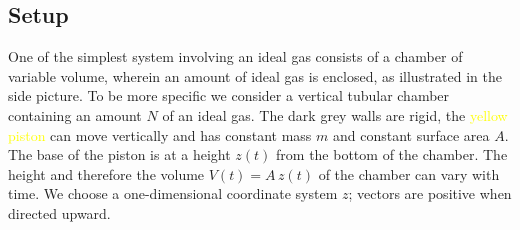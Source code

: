 \documentclass[a4paper,12pt,%
onecolumn,oneside,%
british%
]{memoir}
\renewcommand*{\|}[1][]{\nonscript\:#1\vert\nonscript\:\mathopen{}}
\newcommand*{\yN}{N}
\newcommand*{\ym}{m}%
\begin{document}
\subsection{Setup}
\label{sec:idealgas_ex_setup}

One of the simplest system involving an ideal gas consists of a chamber of variable volume, wherein an amount of ideal gas is enclosed, as illustrated in the side picture.
To be more specific we consider a vertical tubular chamber containing an amount $\yN$ of an ideal gas. The \textcolor{midgrey}{dark grey walls} are rigid, the \textcolor{yellow}{yellow piston} can move vertically and has constant mass $\ym$ and constant surface area $A$.
%
%
The base of the piston is at a height $z(t)$ from the bottom of the chamber. The height and therefore the volume $V(t) = A\,z(t)$ of the chamber can vary with time. We choose a one-dimensional coordinate system $z$; vectors are positive when directed upward.
\end{document}
